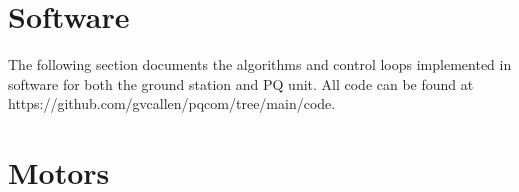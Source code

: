 \section{Software}

The following section documents the algorithms and control loops implemented in software for both the ground station and PQ unit. All code can be found at https://github.com/gvcallen/pqcom/tree/main/code.

\section{Motors}
